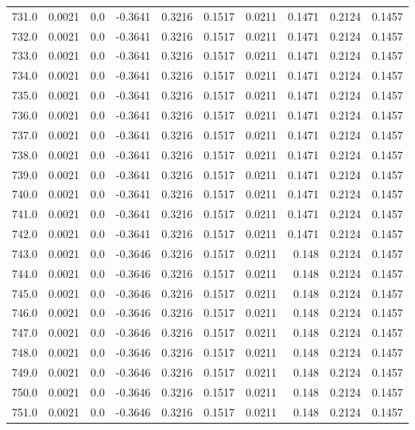 \begin{longtable}{lrrrrrrrrr}
731.0 & 0.0021 & 0.0 & -0.3641 & 0.3216 & 0.1517 & 0.0211 & 0.1471 & 0.2124 & 0.1457 \\
732.0 & 0.0021 & 0.0 & -0.3641 & 0.3216 & 0.1517 & 0.0211 & 0.1471 & 0.2124 & 0.1457 \\
733.0 & 0.0021 & 0.0 & -0.3641 & 0.3216 & 0.1517 & 0.0211 & 0.1471 & 0.2124 & 0.1457 \\
734.0 & 0.0021 & 0.0 & -0.3641 & 0.3216 & 0.1517 & 0.0211 & 0.1471 & 0.2124 & 0.1457 \\
735.0 & 0.0021 & 0.0 & -0.3641 & 0.3216 & 0.1517 & 0.0211 & 0.1471 & 0.2124 & 0.1457 \\
736.0 & 0.0021 & 0.0 & -0.3641 & 0.3216 & 0.1517 & 0.0211 & 0.1471 & 0.2124 & 0.1457 \\
737.0 & 0.0021 & 0.0 & -0.3641 & 0.3216 & 0.1517 & 0.0211 & 0.1471 & 0.2124 & 0.1457 \\
738.0 & 0.0021 & 0.0 & -0.3641 & 0.3216 & 0.1517 & 0.0211 & 0.1471 & 0.2124 & 0.1457 \\
739.0 & 0.0021 & 0.0 & -0.3641 & 0.3216 & 0.1517 & 0.0211 & 0.1471 & 0.2124 & 0.1457 \\
740.0 & 0.0021 & 0.0 & -0.3641 & 0.3216 & 0.1517 & 0.0211 & 0.1471 & 0.2124 & 0.1457 \\
741.0 & 0.0021 & 0.0 & -0.3641 & 0.3216 & 0.1517 & 0.0211 & 0.1471 & 0.2124 & 0.1457 \\
742.0 & 0.0021 & 0.0 & -0.3641 & 0.3216 & 0.1517 & 0.0211 & 0.1471 & 0.2124 & 0.1457 \\
743.0 & 0.0021 & 0.0 & -0.3646 & 0.3216 & 0.1517 & 0.0211 & 0.148 & 0.2124 & 0.1457 \\
744.0 & 0.0021 & 0.0 & -0.3646 & 0.3216 & 0.1517 & 0.0211 & 0.148 & 0.2124 & 0.1457 \\
745.0 & 0.0021 & 0.0 & -0.3646 & 0.3216 & 0.1517 & 0.0211 & 0.148 & 0.2124 & 0.1457 \\
746.0 & 0.0021 & 0.0 & -0.3646 & 0.3216 & 0.1517 & 0.0211 & 0.148 & 0.2124 & 0.1457 \\
747.0 & 0.0021 & 0.0 & -0.3646 & 0.3216 & 0.1517 & 0.0211 & 0.148 & 0.2124 & 0.1457 \\
748.0 & 0.0021 & 0.0 & -0.3646 & 0.3216 & 0.1517 & 0.0211 & 0.148 & 0.2124 & 0.1457 \\
749.0 & 0.0021 & 0.0 & -0.3646 & 0.3216 & 0.1517 & 0.0211 & 0.148 & 0.2124 & 0.1457 \\
750.0 & 0.0021 & 0.0 & -0.3646 & 0.3216 & 0.1517 & 0.0211 & 0.148 & 0.2124 & 0.1457 \\
751.0 & 0.0021 & 0.0 & -0.3646 & 0.3216 & 0.1517 & 0.0211 & 0.148 & 0.2124 & 0.1457 \\

\end{longtable}
